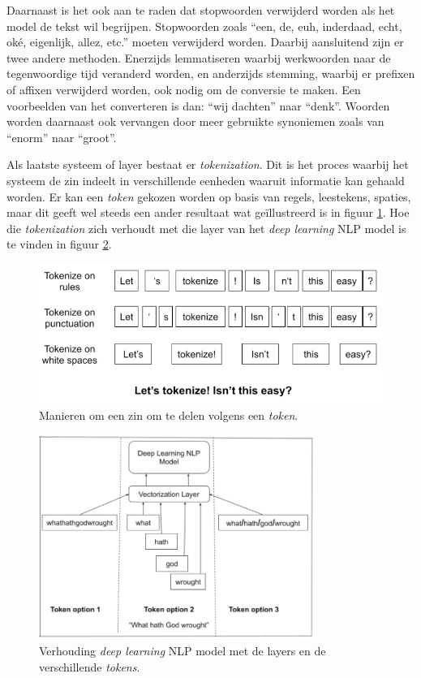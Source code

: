 Daarnaast is het ook aan te raden dat stopwoorden verwijderd worden als het model de tekst wil begrijpen. Stopwoorden zoals ``een, de, euh, inderdaad, echt, oké, eigenlijk, allez, etc.'' moeten verwijderd worden. Daarbij aansluitend zijn er twee andere methoden. Enerzijds lemmatiseren waarbij  werkwoorden naar de tegenwoordige tijd veranderd worden, en anderzijds stemming, waarbij er prefixen of affixen verwijderd worden, ook nodig om de conversie te maken. Een voorbeelden van het converteren is dan: ``wij dachten'' naar ``denk''. Woorden worden daarnaast ook vervangen door meer gebruikte synoniemen zoals van ``enorm'' naar ``groot''.

Als laatste systeem of layer bestaat er \textit{tokenization}. Dit is het proces waarbij het systeem de zin indeelt in verschillende eenheden waaruit informatie kan gehaald worden.
Er kan een \textit{token} gekozen worden op basis van regels, leestekens, spaties, maar dit geeft wel steeds een ander resultaat wat geïllustreerd is in figuur \ref{fig:tokens}. Hoe die \textit{tokenization} zich verhoudt met die layer van het \textit{deep learning} NLP model is te vinden in figuur \ref{fig:tokens_verhouding_dl}.

\begin{figure}
    \centering
    \includegraphics[width=1\textwidth]{./img/tokenize_manier}
    \caption{\label{fig:tokens} Manieren om een zin om te delen volgens een \textit{token}.~\autocite{Horan2020}}
\end{figure}

\begin{figure}
    \centering
    \includegraphics[width=0.8\textwidth]{./img/tokenization-1}
    \caption{\label{fig:tokens_verhouding_dl}Verhouding \textit{deep learning} NLP model met de layers en de verschillende \textit{tokens}.~\autocite{Horan2020}}
\end{figure}

